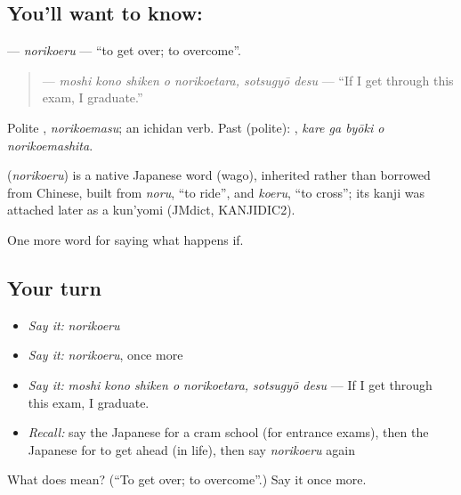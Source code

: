 \subsection*{You'll want to know: }
\textbf{} — \emph{norikoeru} — \textquotedblleft{}to get over; to overcome\textquotedblright{}.

\begin{quote}
\textbf{   } — \emph{moshi kono shiken o norikoetara, sotsugyō desu} — \textquotedblleft{}If I get through this exam, I graduate.\textquotedblright{}
\end{quote}

Polite \textbf{}, \emph{norikoemasu}; an ichidan verb. Past (polite): \textbf{  }, \emph{kare ga byōki o norikoemashita}.

\begin{cousinweb}
\textbf{} (\emph{norikoeru}) is a native Japanese word (wago), inherited rather than borrowed from Chinese, built from \emph{noru}, \textquotedblleft{}to ride\textquotedblright{}, and \emph{koeru}, \textquotedblleft{}to cross\textquotedblright{}; its kanji was attached later as a kun'yomi (JMdict, KANJIDIC2).
\end{cousinweb}

\begin{grammarlens}[title={What you've built}]
One more word for saying what happens if.
\end{grammarlens}

\subsection*{Your turn}
\begin{itemize}
\raggedright
  \item \emph{Say it:} \emph{norikoeru}
  \item \emph{Say it:} \emph{norikoeru}, once more
  \item \emph{Say it:} \emph{moshi kono shiken o norikoetara, sotsugyō desu} — If I get through this exam, I graduate.
  \item \emph{Recall:} say the Japanese for a cram school (for entrance exams), then the Japanese for to get ahead (in life), then say \emph{norikoeru} again
\end{itemize}

\begin{tcolorbox}[breakable,colback=teal!4,colframe=teal!35!black,title={Before you move on}]
What does  mean? (\textquotedblleft{}To get over; to overcome\textquotedblright{}.) Say it once more.
\end{tcolorbox}
